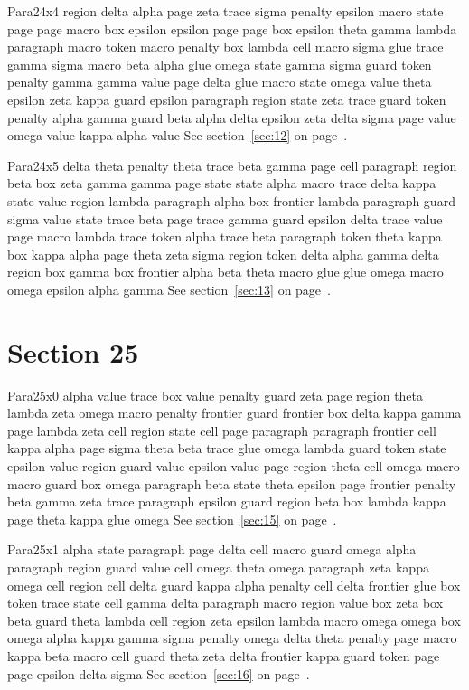 \documentclass{article}
\begin{document}
Para24x4 region delta alpha page zeta trace sigma penalty epsilon macro state page page macro box epsilon epsilon page page box epsilon theta gamma lambda paragraph macro token macro penalty box lambda cell macro sigma glue trace gamma sigma macro beta alpha glue omega state gamma sigma guard token penalty gamma gamma value page delta glue macro state omega value theta epsilon zeta kappa guard epsilon paragraph region state zeta trace guard token penalty alpha gamma guard beta alpha delta epsilon zeta delta sigma page value omega value kappa alpha value See section~\ref{sec:12} on page~\pageref{sec:36}.

Para24x5 delta theta penalty theta trace beta gamma page cell paragraph region beta box zeta gamma gamma page state state alpha macro trace delta kappa state value region lambda paragraph alpha box frontier lambda paragraph guard sigma value state trace beta page trace gamma guard epsilon delta trace value page macro lambda trace token alpha trace beta paragraph token theta kappa box kappa alpha page theta zeta sigma region token delta alpha gamma delta region box gamma box frontier alpha beta theta macro glue glue omega macro omega epsilon alpha gamma See section~\ref{sec:13} on page~\pageref{sec:37}.

\section{Section 25}\label{sec:25}
Para25x0 alpha value trace box value penalty guard zeta page region theta lambda zeta omega macro penalty frontier guard frontier box delta kappa gamma page lambda zeta cell region state cell page paragraph paragraph frontier cell kappa alpha page sigma theta beta trace glue omega lambda guard token state epsilon value region guard value epsilon value page region theta cell omega macro macro guard box omega paragraph beta state theta epsilon page frontier penalty beta gamma zeta trace paragraph epsilon guard region beta box lambda kappa page theta kappa glue omega See section~\ref{sec:15} on page~\pageref{sec:35}.

Para25x1 alpha state paragraph page delta cell macro guard omega alpha paragraph region guard value cell omega theta omega paragraph zeta kappa omega cell region cell delta guard kappa alpha penalty cell delta frontier glue box token trace state cell gamma delta paragraph macro region value box zeta box beta guard theta lambda cell region zeta epsilon lambda macro omega omega box omega alpha kappa gamma sigma penalty omega delta theta penalty page macro kappa beta macro cell guard theta zeta delta frontier kappa guard token page page epsilon delta sigma See section~\ref{sec:16} on page~\pageref{sec:36}.
\end{document}
